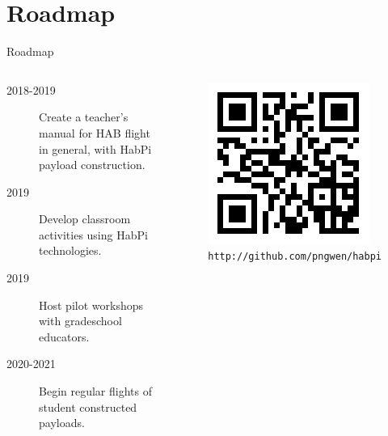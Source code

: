 \documentclass[handout]{beamer}
\begin{document}
\section{Roadmap}
\begin{frame}{Roadmap}
	\begin{columns}
		\begin{description}
        \item[2018-2019] Create a teacher's manual for HAB flight in general, with HabPi payload construction.
        \item[2019] Develop classroom activities using HabPi technologies.
        \item[2019] Host pilot workshops with gradeschool educators.
        \item[2020-2021] Begin regular flights of student constructed payloads.
		\end{description}

		\begin{figure}
		\centering
		\includegraphics[width=\textwidth]{images/habpiGithub}
		\caption{\tiny \tt http://github.com/pngwen/habpi}
		\end{figure}
	\end{columns}
\end{frame}
\end{document}
